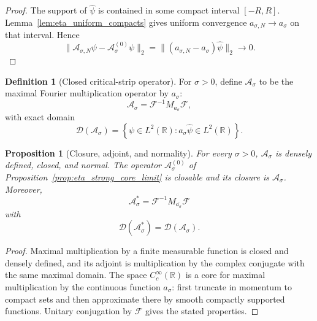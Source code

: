 \documentclass[11pt]{amsart}
\numberwithin{equation}{section}
\theoremstyle{plain}
\newtheorem{proposition}[theorem]{Proposition}
\theoremstyle{definition}
\newtheorem{definition}[theorem]{Definition}
\theoremstyle{remark}
\newcommand{\R}{\mathbb{R}}
\newcommand{\Four}{\mathcal{F}}
\newcommand{\Dom}{\mathcal{D}}
\begin{document}
\begin{proof}
The support of $\widehat\psi$ is contained in some compact interval
$[-R,R]$.  Lemma~\ref{lem:eta_uniform_compacts} gives uniform convergence
$a_{\sigma,N}\to a_\sigma$ on that interval.  Hence
\begin{equation}
\|\mathcal A_{\sigma,N}\psi-\mathcal A_\sigma^{(0)}\psi\|_2
=
\|(a_{\sigma,N}-a_\sigma)\widehat\psi\|_2
\longrightarrow0.
\label{eq:eta_core_norm_convergence}
\end{equation}
\end{proof}

\begin{definition}[Closed critical-strip operator]
\label{def:closed_eta_operator}
For $\sigma>0$, define $\mathcal A_\sigma$ to be the maximal Fourier
multiplication operator by $a_\sigma$:
\begin{equation}
\mathcal A_\sigma
=\Four^{-1}M_{a_\sigma}\Four,
\label{eq:eta_closed_operator}
\end{equation}
with exact domain
\begin{equation}
\Dom(\mathcal A_\sigma)
=\left\{
\psi\in L^2(\R):
 a_\sigma\widehat\psi\in L^2(\R)
\right\}.
\label{eq:eta_closed_domain}
\end{equation}
\end{definition}

\begin{proposition}[Closure, adjoint, and normality]
\label{prop:eta_closed_properties}
For every $\sigma>0$, $\mathcal A_\sigma$ is densely defined, closed, and
normal.  The operator $\mathcal A_\sigma^{(0)}$ of
Proposition~\ref{prop:eta_strong_core_limit} is closable and its closure is
$\mathcal A_\sigma$.  Moreover,
\begin{equation}
\mathcal A_\sigma^*
=\Four^{-1}M_{\overline{a_\sigma}}\Four
\label{eq:eta_adjoint}
\end{equation}
with
\begin{equation}
\Dom(\mathcal A_\sigma^*)
=\Dom(\mathcal A_\sigma).
\label{eq:eta_adjoint_domain}
\end{equation}
\end{proposition}

\begin{proof}
Maximal multiplication by a finite measurable function is closed and
densely defined, and its adjoint is multiplication by the complex
conjugate with the same maximal domain.  The space $C_c^\infty(\R)$ is a
core for maximal multiplication by the continuous function $a_\sigma$:
first truncate in momentum to compact sets and then approximate there by
smooth compactly supported functions.  Unitary conjugation by $\Four$
gives the stated properties.
\end{proof}
\end{document}
